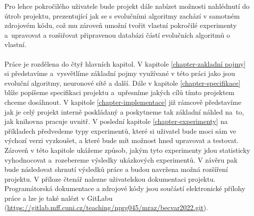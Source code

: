 Pro lehce pokročilého uživatele bude projekt dále nabízet možnosti nahlédnutí
do útrob projektu, prezentující jak se s evolučními algoritmy zachází v
samotném zdrojovém kódu, což mu zároveň umožní tvořit vlastní pokročilé
experimenty a~upravovat a rozšiřovat připravenou databázi částí evolučních
algoritmů o vlastní.

\paragraph{}
Práce je rozdělena do čtyř hlavních kapitol. V kapitole
\ref{chapter-zakladní pojmy} si představíme a~vysvětlíme základní pojmy
využívané v této práci jako jsou evoluční algoritmy, neuronové sítě a další.
Dále v kapitole \ref{chapter-specifikace} blíže popíšeme specifikaci projektu
a~upřesníme jakých cílů tímto projektem chceme dosáhnout. V kapitole
\ref{chapter-implementace} již rámcově představíme jak je celý projekt interně
poskládaný a poskytneme tak základní náhled na~to, jak knihovna pracuje uvnitř.
V poslední kapitole \ref{chapter-experimenty} na příkladech předvedeme
typy experimentů, které si uživatel bude moci sám ve výchozí verzi vyzkoušet, a
které bude mít možnost hned upravovat a testovat. Zároveň v této kapitole
ukážeme způsob, jakým tyto experimenty jdou statisticky vyhodnocovat
a~rozebereme výsledky ukázkových experimentů. V závěru pak bude následovat
shrnutí výsledků práce a budou navržena možná rozšíření projektu. V příloze
čtenář nalezne uživatelskou dokumentaci projektu. Programátorská dokumentace a
zdrojové kódy jsou součástí elektronické přílohy práce a lze je také nalézt v
GitLabu
(\url{https://gitlab.mff.cuni.cz/teaching/nprg045/mraz/becvar2022.git}).
